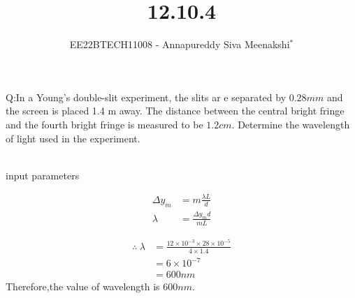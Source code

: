 \documentclass[journal,12pt,onecolumn]{IEEEtran}
\theoremstyle{remark}
\begin{document}

\vspace{3cm}

\title{12.10.4}
\author{EE22BTECH11008 - Annapureddy Siva Meenakshi$^{*}$%
}
\maketitle
\bigskip

\renewcommand{\thefigure}{\theenumi}
\renewcommand{\thetable}{\theenumi}
Q:In a Young's double-slit experiment, the slits ar e separated by
$0.28 mm$ and the screen is placed 1.4 m away. The distance between
the central bright fringe and the fourth bright fringe is measured
to be $1.2 cm$. Determine the wavelength of light used in the
experiment.
\\\solution\\
\begin{table}[!ht]
    \centering
        
    \caption{input parameters}
    \label{tab:12_10_4_1}
\end{table}
\begin{align}
\Delta y_m &= m \frac{\lambda L}{d} \\
\lambda&=\frac {\Delta y_m d}{mL}
\end{align}

\begin{align}
  \therefore\ \lambda&=\frac{12\times 10^{-3}\times28 \times 10^{-5}}{4\times1.4}\\
&=6\times 10^{-7}\\
&=600nm
\end{align}
Therefore,the value of wavelength is $600nm$.
\end{document}
